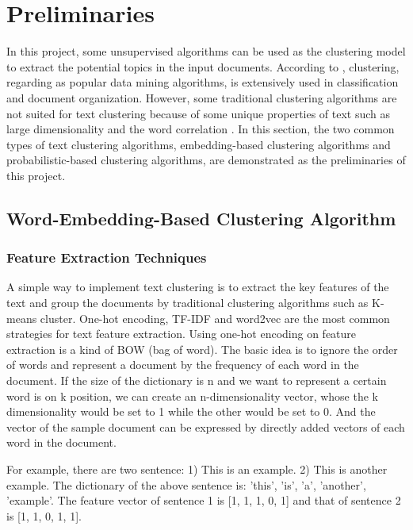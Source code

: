 \chapter{Preliminaries}
\label{ch:preliminaries}

In this project, some unsupervised algorithms can be used as the clustering model to extract the potential topics in the input documents. According to \cite{allahyari2017brief}, clustering, regarding as popular data mining algorithms, is extensively used in classification \cite{baker1998distributional, bekkerman2001feature} and document organization. However, some traditional clustering algorithms are not suited for text clustering because of some unique properties of text such as large dimensionality and the word correlation \cite{allahyari2017brief}. In this section, the two common types of text clustering algorithms, embedding-based clustering algorithms and probabilistic-based clustering algorithms, are demonstrated as the preliminaries of this project.

\section{Word-Embedding-Based Clustering Algorithm}

\subsection{Feature Extraction Techniques}
A simple way to implement text clustering is to extract the key features of the text and group the documents by traditional clustering algorithms such as K-means cluster. One-hot encoding, TF-IDF and word2vec are the most common strategies for text feature extraction. Using one-hot encoding on feature extraction is a kind of BOW (bag of word). The basic idea is to ignore the order of words and represent a document by the frequency of each word in the document. If the size of the dictionary is n and we want to represent a certain word is on k position, we can create an n-dimensionality vector, whose the k dimensionality would be set to 1 while the other would be set to 0. And the vector of the sample document can be expressed by directly added vectors of each word in the document. 

For example, there are two sentence: 1) This is an example. 2) This is another example. The dictionary of the above sentence is: {'this', 'is', 'a', 'another', 'example'}. The feature vector of sentence 1 is [1, 1, 1, 0, 1] and that of sentence 2 is [1, 1, 0, 1, 1].

